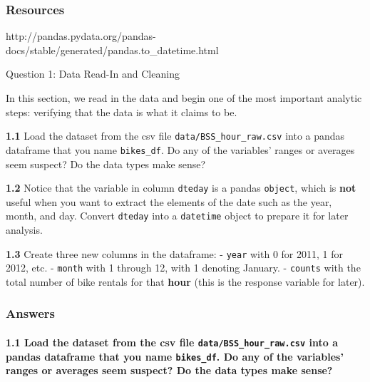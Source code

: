 \documentclass[11pt]{article}
\begin{document}
\subsubsection{Resources}\label{resources}

http://pandas.pydata.org/pandas-docs/stable/generated/pandas.to\_datetime.html

     Question 1: Data Read-In and Cleaning

In this section, we read in the data and begin one of the most important
analytic steps: verifying that the data is what it claims to be.

\textbf{1.1} Load the dataset from the csv file
\texttt{data/BSS\_hour\_raw.csv} into a pandas dataframe that you name
\texttt{bikes\_df}. Do any of the variables' ranges or averages seem
suspect? Do the data types make sense?

\textbf{1.2} Notice that the variable in column \texttt{dteday} is a
pandas \texttt{object}, which is \textbf{not} useful when you want to
extract the elements of the date such as the year, month, and day.
Convert \texttt{dteday} into a \texttt{datetime} object to prepare it
for later analysis.

\textbf{1.3} Create three new columns in the dataframe: - \texttt{year}
with 0 for 2011, 1 for 2012, etc. - \texttt{month} with 1 through 12,
with 1 denoting January. - \texttt{counts} with the total number of bike
rentals for that \textbf{hour} (this is the response variable for
later).

    \subsubsection{Answers}\label{answers}

    \paragraph{\texorpdfstring{\textbf{1.1} Load the dataset from the csv
file \texttt{data/BSS\_hour\_raw.csv} into a pandas dataframe that you
name \texttt{bikes\_df}. Do any of the variables' ranges or averages
seem suspect? Do the data types make
sense?}{1.1 Load the dataset from the csv file data/BSS\_hour\_raw.csv into a pandas dataframe that you name bikes\_df. Do any of the variables' ranges or averages seem suspect? Do the data types make sense?}}\label{load-the-dataset-from-the-csv-file-databss_hour_raw.csv-into-a-pandas-dataframe-that-you-name-bikes_df.-do-any-of-the-variables-ranges-or-averages-seem-suspect-do-the-data-types-make-sense}
\end{document}
